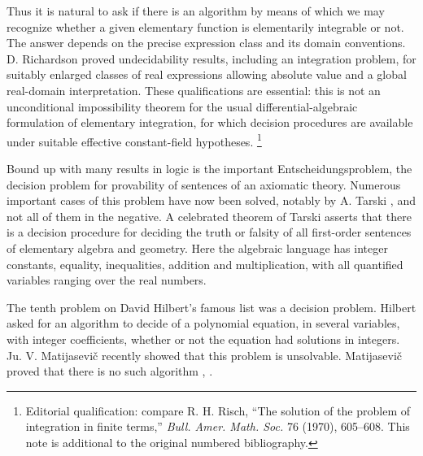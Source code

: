 \documentclass[11pt]{article}
\begin{document}
Thus it is natural to ask if there is an algorithm by means of which we may recognize whether a given elementary function is elementarily integrable or not. The answer depends on the precise expression class and its domain conventions. D. Richardson \cite{r34} proved undecidability results, including an integration problem, for suitably enlarged classes of real expressions allowing absolute value and a global real-domain interpretation. These qualifications are essential: this is not an unconditional impossibility theorem for the usual differential-algebraic formulation of elementary integration, for which decision procedures are available under suitable effective constant-field hypotheses.%
\footnote{Editorial qualification: compare R. H. Risch, ``The solution of the problem of integration in finite terms,'' \emph{Bull. Amer. Math. Soc.} 76 (1970), 605--608. This note is additional to the original numbered bibliography.}

Bound up with many results in logic is the important Entscheidungsproblem, the decision problem for provability of sentences of an axiomatic theory. Numerous important cases of this problem have now been solved, notably by A. Tarski \cite{r40}, and not all of them in the negative. A celebrated theorem of Tarski \cite{r41} asserts that there is a decision procedure for deciding the truth or falsity of all first-order sentences of elementary algebra and geometry. Here the algebraic language has integer constants, equality, inequalities, addition and multiplication, with all quantified variables ranging over the real numbers.

The tenth problem on David Hilbert's famous list \cite{r16} was a decision problem. Hilbert asked for an algorithm to decide of a polynomial equation, in several variables, with integer coefficients, whether or not the equation had solutions in integers. Ju. V. Matijasevič recently showed that this problem is unsolvable. Matijasevič proved that there is no such algorithm \cite{r22}, \cite{r23}.
\end{document}

